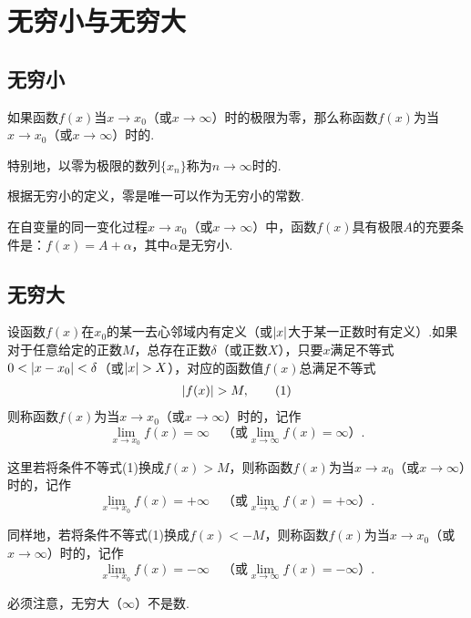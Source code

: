 \section{无穷小与无穷大}
\subsection{无穷小}
\begin{definition}
如果函数\(f(x)\)当\(x \to x_0\)（或\(x \to \infty\)）时的极限为零，那么称函数\(f(x)\)为当\(x \to x_0\)（或\(x \to \infty\)）时的.

特别地，以零为极限的数列\(\{x_n\}\)称为\(n \to \infty\)时的.
\end{definition}

根据无穷小的定义，零是唯一可以作为无穷小的常数.

\begin{theorem}
在自变量的同一变化过程\(x \to x_0\)（或\(x \to \infty\)）中，函数\(f(x)\)具有极限\(A\)的充要条件是：\(f(x) = A + \alpha\)，其中\(\alpha\)是无穷小.
\end{theorem}

\subsection{无穷大}
\begin{definition}
设函数\(f(x)\)在\(x_0\)的某一去心邻域内有定义（或\(\abs{x}\)大于某一正数时有定义）.如果对于任意给定的正数\(M\)，总存在正数\(\delta\)（或正数\(X\)），只要\(x\)满足不等式\(0 < \abs{x - x_0} < \delta\)（或\(\abs{x} > X\)），对应的函数值\(f(x)\)总满足不等式\begin{gather}
\abs{f(x)} > M, \tag1
\end{gather}则称函数\(f(x)\)为当\(x \to x_0\)（或\(x \to \infty\)）时的，记作\[
\lim\limits_{x \to x_0}f(x) = \infty
\quad\text{（或} \lim\limits_{x \to \infty}f(x) = \infty \text{）}.
\]

这里若将条件不等式(1)换成\(f(x) > M\)，则称函数\(f(x)\)为当\(x \to x_0\)（或\(x \to \infty\)）时的，记作\[
\lim\limits_{x \to x_0}f(x) = +\infty
\quad\text{（或} \lim\limits_{x \to \infty}f(x) = +\infty \text{）}.
\]

同样地，若将条件不等式(1)换成\(f(x) < -M\)，则称函数\(f(x)\)为当\(x \to x_0\)（或\(x \to \infty\)）时的，记作\[
\lim\limits_{x \to x_0}f(x) = -\infty
\quad\text{（或} \lim\limits_{x \to \infty}f(x) = -\infty \text{）}.
\]
\end{definition}
必须注意，无穷大（\(\infty\)）不是数.


